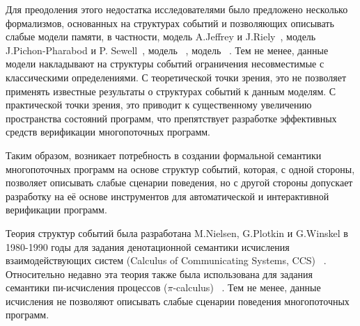 Для преодоления этого недостатка исследователями было
предложено несколько формализмов, основанных на структурах событий
и позволяющих описывать слабые модели памяти,
в частности, модель A.Jeffrey и J.Riely~\autocite{Jeffrey-Riely:LICS16},
модель J.Pichon-Pharabod и P. Sewell~\autocite{PichonPharabod-Sewell:POPL16},
модель \Wkm~\autocite{Chakraborty-Vafeiadis:POPL19},
модель \MRD~\autocite{Paviotti-al:ESOP20}. 
Тем не менее, данные модели накладывают на структуры событий
ограничения несовместимые с классическими определениями. 
С теоретической точки зрения, это не позволяет 
применять известные результаты о структурах событий к данным моделям. 
С практической точки зрения, это приводит к существенному увеличению 
пространства состояний программ, что препятствует разработке эффективных 
средств верификации многопоточных программ.

Таким образом, возникает потребность в создании формальной семантики 
многопоточных программ на основе структур событий, 
которая, с одной стороны, позволяет описывать слабые сценарии поведения, 
но с другой стороны допускает разработку на её основе 
инструментов для автоматической и интерактивной верификации программ. 

{\progress}

Теория структур событий была разработана M.Nielsen, G.Plotkin и G.Winskel
в 1980-1990 годы для задания денотационной семантики 
исчисления взаимодействующих систем (Calculus of Communicating Systems, CCS)%
~\autocite{Winskel:ICALP1982}.
Относительно недавно эта теория также была использована 
для задания семантики пи-исчисления процессов ($\pi$-calculus)%
~\autocite{Varacca-Nobuko:TCS10,Crafa-al:FSCCS12,Hildebrandt-al:LATA2017}.
Тем не менее, данные исчисления не позволяют описывать 
слабые сценарии поведения многопоточных программ.

